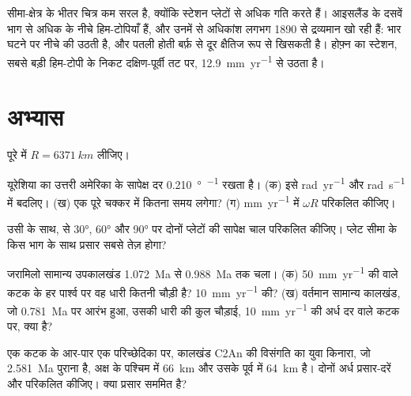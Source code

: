 सीमा-क्षेत्र के भीतर चित्र कम सरल है, क्योंकि स्टेशन प्लेटों से अधिक गति करते हैं। आइसलैंड के दसवें भाग से अधिक के नीचे हिम-टोपियाँ हैं, और उनमें से अधिकांश लगभग 1890 से द्रव्यमान खो रही हैं: भार घटने पर नीचे की  उठती है, और पतली होती बर्फ़ से दूर क्षैतिज रूप से खिसकती है। होफ़्न का स्टेशन, सबसे बड़ी हिम-टोपी के निकट दक्षिण-पूर्वी तट पर, \qty{12.9}{mm.yr^{-1}} से उठता है।

\section{अभ्यास}

पूरे में $R = \qty{6371}{km}$ लीजिए।

\begin{exercise}[$\star$]\label{exo:b1:plate-kinematics:1}
यूरेशिया का उत्तरी अमेरिका के सापेक्ष  दर \qty{0.210}{\degree\per\Myr} रखता है। (क) इसे \unit{rad.yr^{-1}} और \unit{rad.s^{-1}} में बदलिए। (ख) एक पूरे चक्कर में कितना समय लगेगा? (ग) \unit{mm.yr^{-1}} में $\omega R$ परिकलित कीजिए।
\end{exercise}

\begin{exercise}[$\star$]\label{exo:b1:plate-kinematics:2}
उसी  के साथ,  से \ang{30}, \ang{60} और \ang{90} पर दोनों प्लेटों की सापेक्ष चाल परिकलित कीजिए। प्लेट सीमा के किस भाग के साथ प्रसार सबसे तेज़ होगा?
\end{exercise}

\begin{exercise}[$\star$]\label{exo:b1:plate-kinematics:3}
जरामिलो सामान्य उपकालखंड \qty{1.072}{Ma} से \qty{0.988}{Ma} तक चला। (क) \qty{50}{mm.yr^{-1}} की  वाले कटक के हर पार्श्व पर वह धारी कितनी चौड़ी है? \qty{10}{mm.yr^{-1}} की? (ख) वर्तमान सामान्य कालखंड, जो \qty{0.781}{Ma} पर आरंभ हुआ, उसकी धारी की कुल चौड़ाई, \qty{10}{mm.yr^{-1}} की अर्ध दर वाले कटक पर, क्या है?
\end{exercise}

\begin{exercise}[$\star$]\label{exo:b1:plate-kinematics:4}
एक कटक के आर-पार एक परिच्छेदिका पर, कालखंड C2An की विसंगति का युवा किनारा, जो \qty{2.581}{Ma} पुराना है, अक्ष के पश्चिम में \qty{66}{km} और उसके पूर्व में \qty{64}{km} है। दोनों अर्ध प्रसार-दरें और  परिकलित कीजिए। क्या प्रसार सममित है?
\end{exercise}

